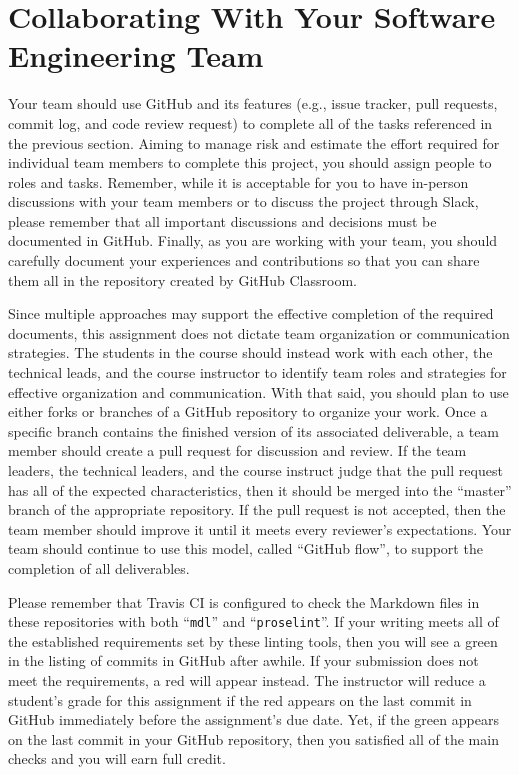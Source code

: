 \documentclass[11pt]{article}
\newcommand{\command}[1]{``\lstinline{#1}''}
\newcommand{\checkmark}{\ding{51}}
\newcommand{\naughtmark}{\ding{55}}
\begin{document}
\section*{Collaborating With Your Software Engineering Team}

Your team should use GitHub and its features (e.g., issue tracker, pull
requests, commit log, and code review request) to complete all of the tasks
referenced in the previous section.
%
Aiming to manage risk and estimate the effort required for individual team
members to complete this project, you should assign people to roles and tasks.
Remember, while it is acceptable for you to have in-person discussions with your
team members or to discuss the project through Slack, please remember that all
important discussions and decisions must be documented in GitHub. Finally, as
you are working with your team, you should carefully document your experiences
and contributions so that you can share them all in the repository created by
GitHub Classroom.

Since multiple approaches may support the effective completion of the required
documents, this assignment does not dictate team organization or communication
strategies. The students in the course should instead work with each other, the
technical leads, and the course instructor to identify team roles and strategies
for effective organization and communication. With that said, you should plan to
use either forks or branches of a GitHub repository to organize your work.
%
Once a specific branch contains the finished version of its associated
deliverable, a team member should create a pull request for discussion and
review. If the team leaders, the technical leaders, and the course instruct
judge that the pull request has all of the expected characteristics, then it
should be merged into the ``master'' branch of the appropriate repository. If
the pull request is not accepted, then the team member should improve it until
it meets every reviewer's expectations. Your team should continue to use this
model, called ``GitHub flow'', to support the completion of all deliverables.

Please remember that Travis CI is configured to check the Markdown files in
these repositories with both \command{mdl} and \command{proselint}.
%
If your writing meets all of the established requirements set by these linting
tools, then you will see a green \checkmark{} in the listing of commits in
GitHub after awhile. If your submission does not meet the requirements, a red
\naughtmark{} will appear instead. The instructor will reduce a student's grade
for this assignment if the red \naughtmark{} appears on the last commit in
GitHub immediately before the assignment's due date. Yet, if the green
\checkmark{} appears on the last commit in your GitHub repository, then you
satisfied all of the main checks and you will earn full credit.
\end{document}
